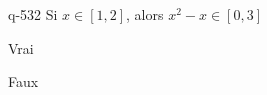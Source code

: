 \begin{truefalse}{q-532}
Si $x\in[1,2]$, alors $x^2-x\in[0,3]$
\item* Vrai
\item Faux
\end{truefalse}


